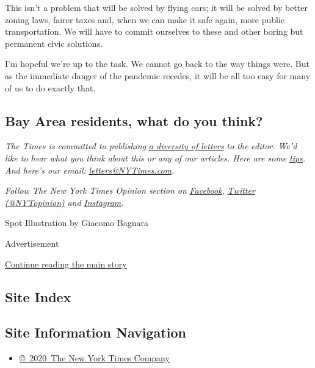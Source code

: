 This isn't a problem that will be solved by flying cars; it will be
solved by better zoning laws, fairer taxes and, when we can make it safe
again, more public transportation. We will have to commit ourselves to
these and other boring but permanent civic solutions.

I'm hopeful we're up to the task. We cannot go back to the way things
were. But as the immediate danger of the pandemic recedes, it will be
all too easy for many of us to do exactly that.

\hypertarget{bay-area-residents-what-do-you-think}{%
\subsection{Bay Area residents, what do you
think?}\label{bay-area-residents-what-do-you-think}}

\emph{The Times is committed to publishing}
\href{https://www.nytimes3xbfgragh.onion/2019/01/31/opinion/letters/letters-to-editor-new-york-times-women.html}{\emph{a
diversity of letters}} \emph{to the editor. We'd like to hear what you
think about this or any of our articles. Here are some}
\href{https://help.nytimes3xbfgragh.onion/hc/en-us/articles/115014925288-How-to-submit-a-letter-to-the-editor}{\emph{tips}}\emph{.
And here's our email:}
\href{mailto:letters@NYTimes.com}{\emph{letters@NYTimes.com}}\emph{.}

\emph{Follow The New York Times Opinion section on}
\href{https://www.facebookcorewwwi.onion/nytopinion}{\emph{Facebook}}\emph{,}
\href{http://twitter.com/NYTOpinion}{\emph{Twitter (@NYTopinion)}}
\emph{and}
\href{https://www.instagram.com/nytopinion/}{\emph{Instagram}}\emph{.}

Spot Illustration by Giacomo Bagnara

Advertisement

\protect\hyperlink{after-bottom}{Continue reading the main story}

\hypertarget{site-index}{%
\subsection{Site Index}\label{site-index}}

\hypertarget{site-information-navigation}{%
\subsection{Site Information
Navigation}\label{site-information-navigation}}

\begin{itemize}
\tightlist
\item
  \href{https://help.nytimes3xbfgragh.onion/hc/en-us/articles/115014792127-Copyright-notice}{©~2020~The
  New York Times Company}
\end{itemize}

